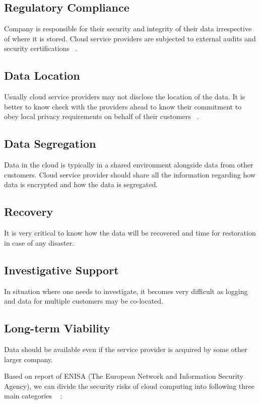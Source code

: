 \subsection{Regulatory Compliance}
Company is responsible for their security and integrity of their data irrespective
of where it is stored. Cloud service providers are subjected to external audits
and security certifications ~\cite{hid-sp18-513-gartner}. 

\subsection{Data Location} 
Usually cloud service providers may not disclose the location of the data.
It is better to know check with the providers ahead to know their commitment to
obey local privacy requirements on behalf of their customers ~\cite{hid-sp18-513-gartner}.

\subsection{Data Segregation} 
Data in the cloud is typically in a shared environment alongside data from 
other customers. Cloud service provider should share all the information
regarding how data is encrypted and how the data is segregated.

\subsection{Recovery} 
It is very critical to know how the data will be recovered and time for restoration
in case of any disaster. 

\subsection{Investigative Support} 
In situation where one needs to investigate, it becomes very difficult as logging 
and data for multiple customers may be co-located.

\subsection{Long-term Viability} 
Data should be available even if the service provider is acquired by some
other larger company.


Based on report of ENISA (The European Network and Information Security Agency),
we can divide the security risks of cloud computing into following three main 
categories ~\cite{hid-sp18-513-enisa} :

